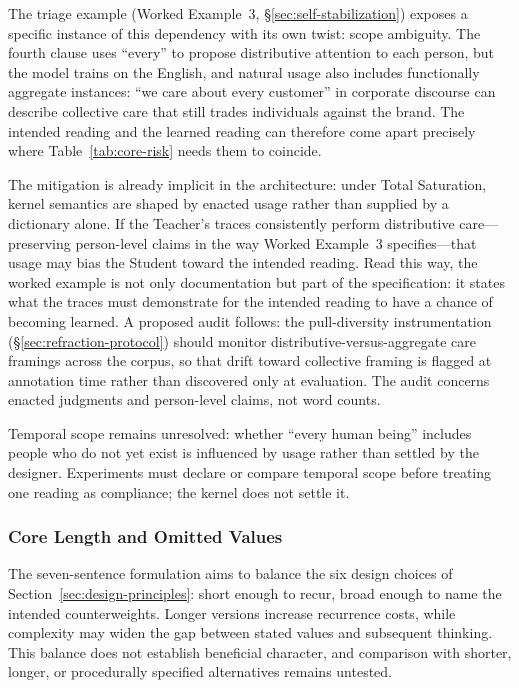 \documentclass[11pt]{article}
\begin{document}
The triage example (Worked Example~3,
\S\ref{sec:self-stabilization}) exposes a specific instance of this dependency
with its own twist: scope ambiguity. The fourth clause uses ``every'' to propose
distributive attention to each person, but the model trains on the English, and
natural usage also includes functionally aggregate instances: ``we care about
every customer'' in corporate discourse can describe collective care that still
trades individuals against the brand. The intended reading and the learned
reading can therefore come apart precisely where Table~\ref{tab:core-risk}
needs them to coincide.

The mitigation is already implicit in the architecture: under Total Saturation,
kernel semantics are shaped by enacted usage rather than supplied by a
dictionary alone. If the Teacher's traces consistently perform distributive
care---preserving person-level claims in the way Worked Example~3
specifies---that usage may bias the Student toward the intended reading. Read
this way, the worked example is not only documentation but part of the
specification: it states what the traces must demonstrate for the intended
reading to have a chance of becoming learned. A proposed audit follows: the
pull-diversity instrumentation (\S\ref{sec:refraction-protocol}) should monitor
distributive-versus-aggregate care framings across the corpus, so that drift
toward collective framing is flagged at annotation time rather than discovered
only at evaluation. The audit concerns enacted judgments and person-level claims, not word counts.

Temporal scope remains unresolved: whether ``every human being'' includes
people who do not yet exist is influenced by usage rather than settled by the
designer. Experiments must declare or compare temporal scope before treating one reading as compliance; the kernel does not settle it.

\subsubsection{Core Length and Omitted Values}

The seven-sentence formulation aims to balance the six design choices of
Section~\ref{sec:design-principles}: short enough to recur, broad enough to name
the intended counterweights. Longer versions increase recurrence costs, while
complexity may widen the gap between stated values and subsequent thinking.
This balance does not establish beneficial character, and comparison with
shorter, longer, or procedurally specified alternatives remains untested.
\end{document}
